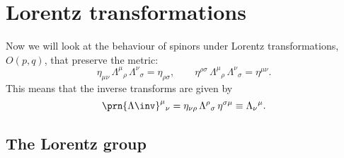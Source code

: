 \documentclass[11pt]{article}
\begin{document}

\section{Lorentz transformations}\label{sec:lorentz}

Now we will look at the behaviour of spinors under Lorentz transformations, \(O(p,q)\), that preserve the metric:
%
\begin{equation}\label{eq:lorentz}
  \eta_{\mu\nu}\, \Lambda^\mu{}_\rho\, \Lambda^\nu{}_\sigma = \eta_{\rho\sigma},
  \qquad
  \eta^{\rho\sigma}\, \Lambda^\mu{}_\rho\, \Lambda^\nu{}_\sigma = \eta^{\mu\nu}.
\end{equation}
%
This means that the inverse transforms are given by
%
\begin{equation}\label{eq:invlorentz}
  \prn{\Lambda\inv}^\mu{}_\nu = \eta_{\nu\rho}\, \Lambda^\rho{}_\sigma\, \eta^{\sigma\mu}
  \equiv \Lambda_\nu{}^\mu.
\end{equation}
%


\subsection{The Lorentz group}\label{sec:group}
\end{document}
